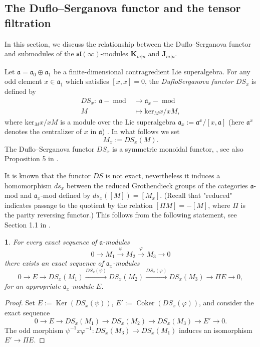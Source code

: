 \documentclass[12pt,oneside,english]{amsart}
\numberwithin{equation}{section}
\numberwithin{figure}{section}
\theoremstyle{plain}
\theoremstyle{plain}
\newtheorem{lem}[thm]{\protect\lemmaname}
\theoremstyle{remark}
\theoremstyle{definition}
\theoremstyle{plain}
\theoremstyle{remark}
\theoremstyle{definition}
\theoremstyle{plain}
\theoremstyle{plain}
\theoremstyle{definition}
\providecommand{\lemmaname}{Lemma}
\newcommand{\bK}{\mathbf{K}}
\newcommand{\bJ}{\mathbf{J}}
\newcommand{\fa}{\mathfrak{a}}
\begin{document}


\subsection{The Duflo--Serganova functor and the tensor filtration}

In this section, we discuss the relationship between the Duflo--Serganova functor and submodules of the $\mathfrak{sl}(\infty)$-modules $\bK_{m|n}$ and $\bJ_{m|n}$.

Let $\fa=\fa_{\bar{0}}\oplus\mathfrak{a}_{\bar{1}}$ be  a finite-dimensional contragredient Lie superalgebra.
For any odd element $x\in\fa_{\bar{1}}$ which satisfies $\left[x,x\right]=0$,  the \emph{Duflo\textendash Serganova functor $DS_{x}$}
is defined by
\begin{align*}
DS_{x}:\ \fa-\operatorname{mod} &\rightarrow\fa_x-\operatorname{mod}  \\ M &\mapsto\mathrm{ker}_{M}x/xM,
\end{align*}
where $\mathrm{ker}_{M}x/xM$ is a module over the Lie superalgebra $\fa_{x}:=\fa^{x}/[x,\fa]$ (here $\fa^{x} $ denotes the centralizer of $x$ in $\fa$) \cite{DS}.
In what follows we set
$$M_x:=DS_{x}(M).$$
The Duflo--Serganova functor $DS_{x}$ is a  symmetric monoidal functor,  \cite{DS}, see also Proposition 5 in \cite{Slec}.

It is known that the functor $DS$ is not exact, nevertheless it induces  a homomorphism $ds_x$ between the reduced Grothendieck groups of the categories
$\fa$-mod and $\fa_x$-mod defined by $ds_x([M])=[M_x]$. (Recall that "reduced" indicates passage to the quotient  by the relation $[\Pi M]=-[M]$, where $\Pi$ is the parity reversing functor.)
This follows from the following statement, see Section 1.1 in \cite{GS}.
\begin{lem}\label{reduced}
For every exact sequence of $\fa$-modules
$$0\to M_1\xrightarrow{\psi} M_2\xrightarrow{\varphi} M_3\to 0$$
there exists an exact sequence of $\fa_x$-modules
$$0 \to E\to DS_x(M_1)\xrightarrow{DS_x(\psi)} DS_x(M_2)\xrightarrow{DS_x(\varphi)} DS_x(M_3)\to\Pi E\to 0,$$
for an appropriate $\fa_x$-module $E$.
\end{lem}
\begin{proof}  Set $E:=\operatorname{Ker}(DS_x(\psi))$, $E':=\operatorname{Coker}(DS_x(\varphi))$, and consider the exact sequence
$$0\to E\to DS_x(M_1)\to DS_x(M_2)\to DS_x(M_3)\to E'\to 0.$$
The odd morphism $\psi^{-1}x\varphi^{-1}:DS_x(M_3)\to DS_x(M_1)$ induces an isomorphism $E'\to\Pi E$.
  \end{proof}
\end{document}
